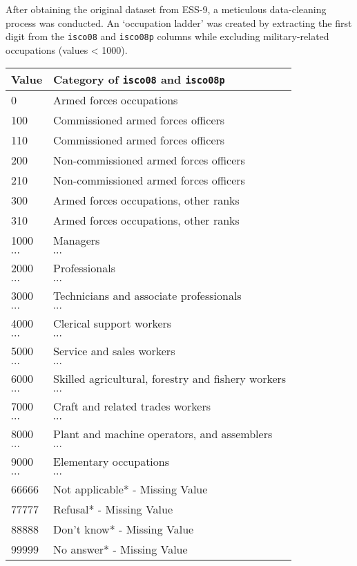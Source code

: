 	\normalsize
	
	After obtaining the original dataset from ESS-9, a meticulous data-cleaning process was conducted. An ‘occupation ladder’ was created by extracting the first digit from the \texttt{isco08} and \texttt{isco08p} columns while excluding military-related occupations (values < 1000).
	
	\begin{longtable}{ll}
		\toprule
		\textbf{Value} & \textbf{Category of \texttt{isco08} and \texttt{isco08p}} \\
		\midrule
		0     & Armed forces occupations \\
		100   & Commissioned armed forces officers \\
		110   & Commissioned armed forces officers \\
		200   & Non-commissioned armed forces officers \\
		210   & Non-commissioned armed forces officers \\
		300   & Armed forces occupations, other ranks \\
		310   & Armed forces occupations, other ranks \\
		1000  & Managers \\
		$\cdots$ & $\cdots$ \\
		2000  & Professionals \\
		$\cdots$ & $\cdots$ \\
		3000  & Technicians and associate professionals \\
		$\cdots$ & $\cdots$ \\
		4000  & Clerical support workers \\
		$\cdots$ & $\cdots$ \\
		5000  & Service and sales workers \\
		$\cdots$ & $\cdots$ \\
		6000  & Skilled agricultural, forestry and fishery workers \\
		$\cdots$ & $\cdots$ \\
		7000  & Craft and related trades workers \\
		$\cdots$ & $\cdots$ \\
		8000  & Plant and machine operators, and assemblers \\
		$\cdots$ & $\cdots$ \\
		9000  & Elementary occupations \\
		$\cdots$ & $\cdots$ \\
		66666 & Not applicable* - Missing Value \\
		77777 & Refusal* - Missing Value \\
		88888 & Don't know* - Missing Value \\
		99999 & No answer* - Missing Value \\
		\bottomrule
	\end{longtable}
	
